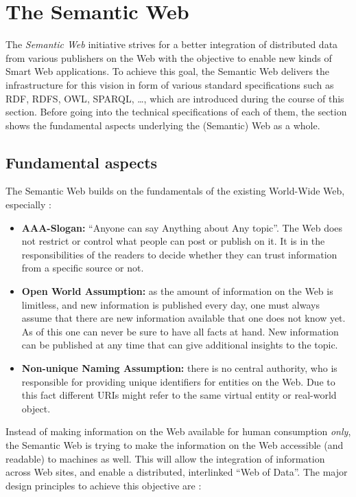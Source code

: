 
\section{The Semantic Web}
\label{sec:semantic_web}

The \emph{Semantic Web} initiative strives for a better integration of distributed data from various publishers on the Web with the objective to enable new kinds of Smart Web applications. To achieve this goal, the Semantic Web delivers the infrastructure for this vision in form of various standard specifications such as \gls{RDF}, \gls{RDFS}, \gls{OWL}, \gls{SPARQL}, \ldots, which are introduced during the course of this section. Before going into the technical specifications of each of them, the section shows the fundamental aspects underlying the (Semantic) Web as a whole.

\subsection{Fundamental aspects}
\label{subsec:fundamentals_semweb}

The Semantic Web builds on the fundamentals of the existing World-Wide Web, especially \citep[pg. 4-11]{allemang2011semantic}: \@

\begin{itemize}
	\item \textbf{AAA-Slogan:} ``Anyone can say Anything about Any topic''. The Web does not restrict or control what people can post or publish on it. It is in the responsibilities of the readers to decide whether they can trust information from a specific source or not.
	\item \textbf{Open World Assumption:} as the amount of information on the Web is limitless, and new information is published every day, one must always assume that there are new information available that one does not know yet. As of this one can never be sure to have all facts at hand. New information can be published at any time that can give additional insights to the topic.
	\item \textbf{Non-unique Naming Assumption:} there is no central authority, who is responsible for providing unique identifiers for entities on the Web. Due to this fact different \gls{URI}s might refer to the same virtual entity or real-world object.
\end{itemize}

Instead of making information on the Web available for human consumption \emph{only}, the Semantic Web is trying to make the information on the Web accessible (and readable) to machines as well. This will allow the integration of information across Web sites, and enable a distributed, interlinked ``Web of Data''. The major design principles to achieve this objective are \citep[pg. 1-22]{antoniou2012semantic}: \@

